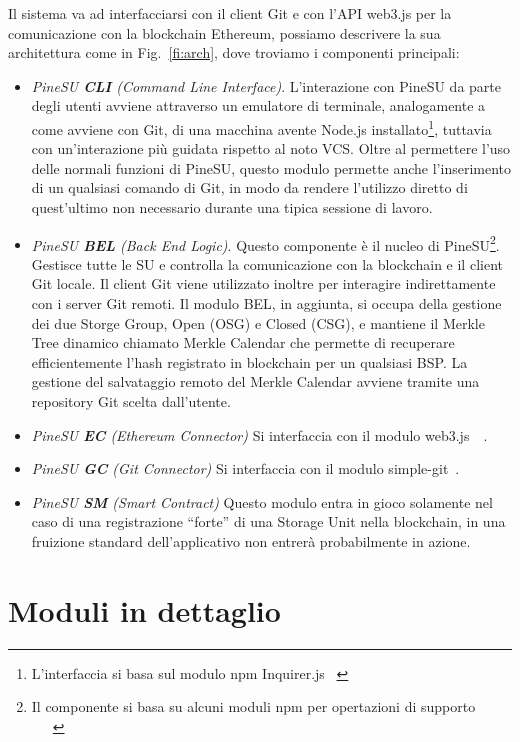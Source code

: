 Il sistema va ad interfacciarsi con il client Git e con l'API \textsf{web3.js} per la comunicazione
con la blockchain Ethereum, possiamo descrivere la sua architettura come in Fig.~\ref{fi:arch}, dove troviamo i componenti principali:
\begin{itemize}
    \item \emph{PineSU \textbf{CLI} (Command Line Interface)}. L'interazione con PineSU da parte degli utenti avviene attraverso un emulatore di terminale, analogamente a come avviene con Git, di una macchina avente Node.js installato\footnote{L'interfaccia si basa sul modulo npm Inquirer.js ~\cite{inquirer-github-21}}, tuttavia con un'interazione più guidata rispetto al noto VCS. Oltre al permettere l'uso delle normali funzioni di PineSU, questo modulo permette anche l'inserimento di un qualsiasi comando di Git, in modo da rendere l'utilizzo diretto di quest'ultimo non necessario durante una tipica sessione di lavoro.
    \item \emph{PineSU \textbf{BEL} (Back End Logic)}. Questo componente è il nucleo di PineSU\footnote{Il componente si basa su alcuni moduli npm per opertazioni di supporto ~\cite{adm-zip-github-21}~\cite{chalk-github-21}~\cite{merkle-tools-github-21}}. Gestisce tutte le SU e controlla la comunicazione con la blockchain e il client Git locale.
    Il client Git viene utilizzato inoltre per interagire indirettamente con i server Git remoti.
    Il modulo BEL, in aggiunta, si occupa della gestione dei due Storge Group, Open (OSG) e Closed (CSG), e
    mantiene il Merkle Tree dinamico chiamato Merkle Calendar che permette di recuperare efficientemente
    l'hash registrato in blockchain per un qualsiasi BSP. La gestione del salvataggio remoto del Merkle Calendar avviene tramite una repository Git scelta dall'utente.
    \item \emph{PineSU \textbf{EC} (Ethereum Connector)} Si interfaccia con il modulo \textsf{web3.js}~\cite{web3js-github-21}~\cite{web3js-doc-21}. 
    \item \emph{PineSU \textbf{GC} (Git Connector)} Si interfaccia con il modulo \textsf{simple-git}~\cite{simple-git-github-21}. 
    \item \emph{PineSU \textbf{SM} (Smart Contract)} Questo modulo entra in gioco solamente nel caso di una registrazione “forte” di una Storage Unit nella blockchain, in una fruizione standard dell'applicativo non entrerà probabilmente in azione.
\end{itemize}

\section{Moduli in dettaglio}
